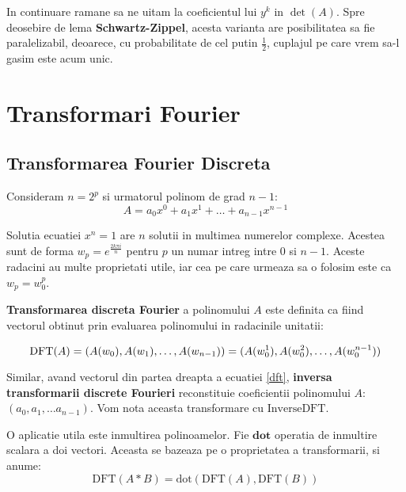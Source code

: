 In continuare ramane sa ne uitam la coeficientul lui $y^{k}$ in $\det(A)$. Spre
deosebire de lema \textbf{Schwartz-Zippel}, acesta varianta are posibilitatea sa fie
paralelizabil, deoarece, cu probabilitate de cel putin $\frac{1}{2}$, cuplajul
pe care vrem sa-l gasim este acum unic.

\pagebreak

\section{Transformari Fourier}

\subsection{Transformarea Fourier Discreta}
Consideram $n = 2^{p}$ si urmatorul polinom de grad $n-1$:
\begin{equation}
  A = a_{0}x^{0} + a_{1}x^{1} + \ldots + a_{n-1}x^{n-1}
\end{equation}

Solutia ecuatiei $x^{n} = 1$ are $n$ solutii in multimea numerelor complexe.
Acestea sunt de forma $w_{p} = e^{\frac{2k\pi i}{n}}$ pentru $p$ un numar intreg
intre $0$ si $n-1$. Aceste radacini au multe proprietati utile, iar cea pe care
urmeaza sa o folosim este ca $w_{p} = w_{0}^{p}$. \par
\textbf{Transformarea discreta Fourier} a polinomului $A$ este definita ca fiind
vectorul obtinut prin evaluarea polinomului in radacinile unitatii:

\begin{equation}
  \label{dft}
  \text{DFT}(A) = (A(w_{0}), A(w_{1}), \ldots, A(w_{n-1})) \\
                = (A(w_{0}^{1}), A(w_{0}^{2}), \ldots, A(w_{0}^{n-1}))
\end{equation}

Similar, avand vectorul din partea dreapta a ecuatiei \ref{dft}, \textbf{inversa
transformarii discrete Fourieri} reconstituie coeficientii polinomului $A$:
$(a_{0}, a_{1}, \ldots a_{n-1})$. Vom nota aceasta transformare cu
$\text{InverseDFT}$. \par

O aplicatie utila este inmultirea polinoamelor. Fie $\textbf{dot}$ operatia de
inmultire scalara a doi vectori. Aceasta se bazeaza pe o
proprietatea a transformarii, si anume:
\begin{equation}
  \text{DFT}(A * B) = \text{dot}(\text{DFT}(A), \text{DFT}(B))
\end{equation}

